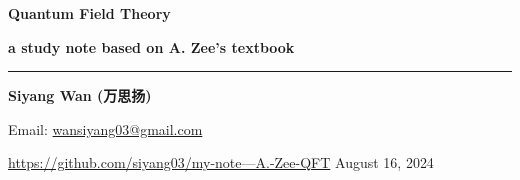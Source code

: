 \begin{titlepage}
	\vspace*{100pt}
	{\Huge \textbf{Quantum Field Theory}}
	
	\vspace{10pt}
	
	{\LARGE \textbf{a study note based on A. Zee's textbook}}
	
	\vspace{30pt}
	
	\noindent\rule[0.5ex]{\linewidth}{2pt} %
	
	\vspace{30pt}
	
	{\large \textbf{Siyang Wan (万思扬)}}
	
	\vfill
	
	Email: \href{mailto:wansiyang03@gmail.com}{wansiyang03@gmail.com}
	
	\href{https://github.com/siyang03/my-note---A.-Zee-QFT}{https://github.com/siyang03/my-note---A.-Zee-QFT} \hfill August 16, 2024
\end{titlepage}